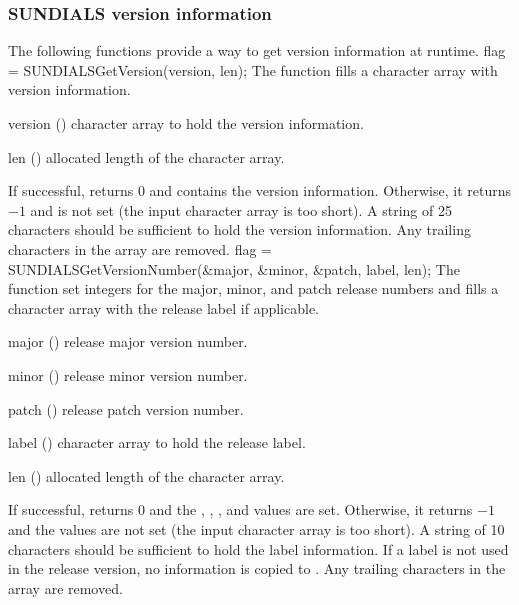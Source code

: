 
\subsubsection{SUNDIALS version information} \label{sss:sunversioninfo}

The following functions provide a way to get {\sundials} version
information at runtime.
{
  flag = SUNDIALSGetVersion(version, len);
}
{
  The function  fills a character array with {\sundials}
  version information.
}
{
  \begin{args}[version]
  \item[version] () character array to hold the {\sundials} version information.
  \item[len]     ()    allocated length of the  character array.
  \end{args}
}
{
  If successful,  returns 0 and
   contains the {\sundials} version
  information. Otherwise, it returns $-1$ and  is not
  set (the input character array is too short).
}
{
  A string of 25 characters should be sufficient to hold the version
  information. Any trailing characters in the  array are
  removed.
}
{
  flag = SUNDIALSGetVersionNumber(\&major, \&minor, \&patch, label, len);
}
{
  The function  set integers for the
  {\sundials} major, minor, and patch release numbers and fills a
  character array with the release label if applicable.
}
{
  \begin{args}[length]
  \item[major] ()    {\sundials} release major version number.
  \item[minor] ()    {\sundials} release minor version number.
  \item[patch] ()    {\sundials} release patch version number.
  \item[label] () character array to hold the {\sundials} release label.
  \item[len]   ()    allocated length of the  character array.
  \end{args}
}
{
  If successful,  returns 0 and the
  , , , and  values are
  set. Otherwise, it returns $-1$ and the values are not set (the
  input character array is too short).
}
{
  A string of 10 characters should be sufficient to hold the label
  information. If a label is not used in the release version, no
  information is copied to . Any trailing characters in the
   array are removed. 
}

